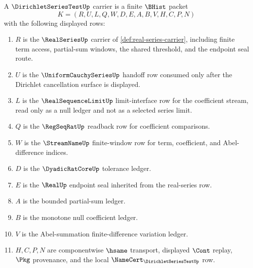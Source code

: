 \begin{definition}
\label{def:dirichlet-series-test-carrier}
A $\DirichletSeriesTestUp$ carrier is a finite $\BHist$ packet
$$
K=(R,U,L,Q,W,D,E,A,B,V,H,C,P,N)
$$
with the following displayed rows:
\begin{enumerate}
\item $R$ is the $\RealSeriesUp$ carrier of \autoref{def:real-series-carrier}, including finite term access, partial-sum windows, the shared threshold, and the endpoint seal route.
\item $U$ is the $\UniformCauchySeriesUp$ handoff row consumed only after the Dirichlet cancellation surface is displayed.
\item $L$ is the $\RealSequenceLimitUp$ limit-interface row for the coefficient stream, read only as a null ledger and not as a selected series limit.
\item $Q$ is the $\RegSeqRatUp$ readback row for coefficient comparisons.
\item $W$ is the $\StreamNameUp$ finite-window row for term, coefficient, and Abel-difference indices.
\item $D$ is the $\DyadicRatCoreUp$ tolerance ledger.
\item $E$ is the $\RealUp$ endpoint seal inherited from the real-series row.
\item $A$ is the bounded partial-sum ledger.
\item $B$ is the monotone null coefficient ledger.
\item $V$ is the Abel-summation finite-difference variation ledger.
\item $H,C,P,N$ are componentwise $\hsame$ transport, displayed $\Cont$ replay, $\Pkg$ provenance, and the local $\NameCert_{\DirichletSeriesTestUp}$ row.
\end{enumerate}
\end{definition}

